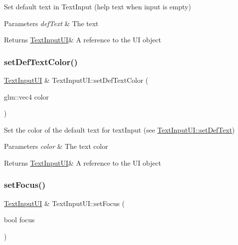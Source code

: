 Set default text in Text\+Input (help text when input is empty) 


\begin{DoxyParams}{Parameters}
{\em def\+Text} & The text \\
\hline
\end{DoxyParams}
\begin{DoxyReturn}{Returns}
\hyperlink{class_text_input_u_i}{Text\+Input\+UI}\& A reference to the UI object 
\end{DoxyReturn}
\mbox{\label{class_text_input_u_i_acf64c4a0df48d0316126e1e5ae222b41}} 
\subsubsection{\texorpdfstring{set\+Def\+Text\+Color()}{setDefTextColor()}}
{\footnotesize\ttfamily \hyperlink{class_text_input_u_i}{Text\+Input\+UI} \& Text\+Input\+U\+I\+::set\+Def\+Text\+Color (\begin{DoxyParamCaption}\item[{glm\+::vec4}]{color }\end{DoxyParamCaption})}



Set the color of the default text for text\+Input (see \hyperlink{class_text_input_u_i_a7014056f5805634ed5ab0f107c14d581}{Text\+Input\+U\+I\+::set\+Def\+Text}) 


\begin{DoxyParams}{Parameters}
{\em color} & The text color \\
\hline
\end{DoxyParams}
\begin{DoxyReturn}{Returns}
\hyperlink{class_text_input_u_i}{Text\+Input\+UI}\& A reference to the UI object 
\end{DoxyReturn}
\mbox{\label{class_text_input_u_i_a9d3e40a9360c1b17394647d23303df66}} 
\subsubsection{\texorpdfstring{set\+Focus()}{setFocus()}}
{\footnotesize\ttfamily \hyperlink{class_text_input_u_i}{Text\+Input\+UI} \& Text\+Input\+U\+I\+::set\+Focus (\begin{DoxyParamCaption}\item[{bool}]{focus }\end{DoxyParamCaption})}



